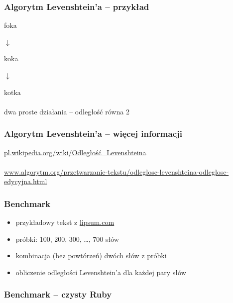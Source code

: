 \documentclass{beamer}
\begin{document}
  \begin{frame}
    \frametitle{Algorytm Levenshtein'a -- przykład}
    \begin{center}
       {\LARGE foka}


       {$\downarrow$}


       {\LARGE {\color{red}k}oka}


       {$\downarrow$}


       {\LARGE ko{\color{red}t}ka \\~\\}
       {\normalsize dwa proste działania -- odległość równa 2}
    \end{center}
  \end{frame}

  \begin{frame}
    \frametitle{Algorytm Levenshtein'a -- więcej informacji}
    \begin{center}
      \href{http://pl.wikipedia.org/wiki/Odleg\%C5\%82o\%C5\%9B\%C4\%87\_Levenshteina}{pl.wikipedia.org/wiki/Odległość\_Levenshteina} \\~\\
      \href{http://www.algorytm.org/przetwarzanie-tekstu/odleglosc-levenshteina-odleglosc-edycyjna.html}{www.algorytm.org/przetwarzanie-tekstu/odleglosc-levenshteina-odleglosc-edycyjna.html}
    \end{center}
  \end{frame}

  \begin{frame}
    \frametitle{Benchmark}
    \begin{center}
      \begin{itemize}
        \item przykładowy tekst z \href{http://lipsum.com/}{lipsum.com}
        \item próbki: 100, 200, 300, \ldots, 700 słów
        \item kombinacja (bez powtórzeń) dwóch słów z próbki
        \item obliczenie odległości Levenshtein'a dla każdej pary słów
      \end{itemize}
    \end{center}
  \end{frame}

  \begin{frame}
    \frametitle{Benchmark -- czysty Ruby}
    \begin{center}
      
    \end{center}
  \end{frame}
\end{document}
